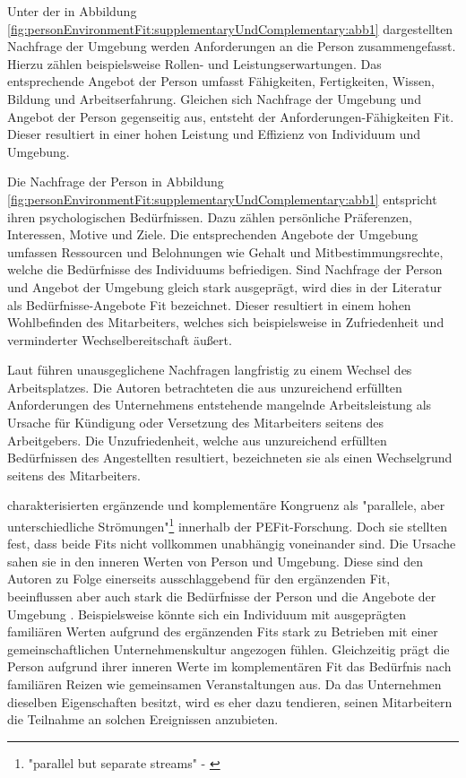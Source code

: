 Unter der in Abbildung \ref{fig:personEnvironmentFit:supplementaryUndComplementary:abb1} dargestellten Nachfrage der Umgebung werden Anforderungen an die Person zusammengefasst. Hierzu zählen beispielsweise Rollen- und Leistungserwartungen. Das entsprechende Angebot der Person umfasst Fähigkeiten, Fertigkeiten, Wissen, Bildung und Arbeitserfahrung. Gleichen sich Nachfrage der Umgebung und Angebot der Person gegenseitig aus, entsteht der Anforderungen-Fähigkeiten Fit. Dieser resultiert in einer hohen Leistung und Effizienz von Individuum und Umgebung. \cite[S. 3f.]{edwards:1991}\cite[S. 5f.]{edwards:1996}\cite[S. 4]{edwards:2007}\cite[S. 7]{su:2015}

Die Nachfrage der Person in Abbildung \ref{fig:personEnvironmentFit:supplementaryUndComplementary:abb1} entspricht ihren psychologischen Bedürfnissen. Dazu zählen persönliche Präferenzen, Interessen, Motive und Ziele. Die entsprechenden Angebote der Umgebung umfassen Ressourcen und Belohnungen wie Gehalt und Mitbestimmungsrechte, welche die Bedürfnisse des Individuums befriedigen. Sind Nachfrage der Person und Angebot der Umgebung gleich stark ausgeprägt, wird dies in der Literatur als Bedürfnisse-Angebote Fit bezeichnet. Dieser resultiert in einem hohen Wohlbefinden des Mitarbeiters, welches sich beispielsweise in Zufriedenheit und verminderter Wechselbereitschaft äußert. \cite[S. 2]{edwards:2004}\cite[S. 2f.]{edwards:1996}\cite[S. 4]{edwards:2008}\cite[S. 4f.]{edwards:2007}\cite[S. 7]{su:2015}

Laut \textcite[S. 9ff.]{workAdjustment:1964} führen unausgeglichene Nachfragen langfristig zu einem Wechsel des Arbeitsplatzes. Die Autoren betrachteten die aus unzureichend erfüllten Anforderungen des Unternehmens entstehende mangelnde Arbeitsleistung als Ursache für Kündigung oder Versetzung des Mitarbeiters seitens des Arbeitgebers. Die Unzufriedenheit, welche aus unzureichend erfüllten Bedürfnissen des Angestellten resultiert, bezeichneten sie als einen Wechselgrund seitens des Mitarbeiters.

\textcite[S. 1, Z. 2]{edwards:2004} charakterisierten ergänzende und komplementäre Kongruenz als "parallele, aber unterschiedliche Strömungen"\footnote{"parallel but separate streams" - \textcite[S. 1, Z. 2]{edwards:2004}} innerhalb der \ac{PEFit}-Forschung. Doch sie stellten fest, dass beide Fits nicht vollkommen unabhängig voneinander sind. Die Ursache sahen sie in den inneren Werten von Person und Umgebung. Diese sind den Autoren zu Folge einerseits ausschlaggebend für den ergänzenden Fit, beeinflussen aber auch stark die Bedürfnisse der Person und die Angebote der Umgebung \cite[S. 3]{edwards:2004}. Beispielsweise könnte sich ein Individuum mit ausgeprägten familiären Werten aufgrund des ergänzenden Fits stark zu Betrieben mit einer gemeinschaftlichen Unternehmenskultur angezogen fühlen. Gleichzeitig prägt die Person aufgrund ihrer inneren Werte im komplementären Fit das Bedürfnis nach familiären Reizen wie gemeinsamen Veranstaltungen aus. Da das Unternehmen dieselben Eigenschaften besitzt, wird es eher dazu tendieren, seinen Mitarbeitern die Teilnahme an solchen Ereignissen anzubieten.

